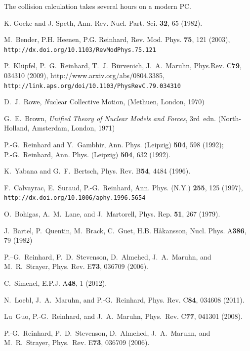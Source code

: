 \documentclass[A4]{elsarticle}
\begin{document}
The collision calculation takes several hours on a modern PC.

\begin{thebibliography}{99}

K. Goeke and J. Speth,
Ann. Rev. Nucl. Part. Sci. {\bf 32}, 65 (1982).


M.~Bender, P.H. Heenen, P.G. Reinhard, Rev. Mod. Phys. \textbf{75}, 121 (2003),
  \texttt{http://dx.doi.org/10.1103/RevModPhys.75.121}

P.~Kl\"upfel, P.~G.~Reinhard, T.~J.~B\"urvenich, J.~A.~Maruhn, Phys.Rev. 
  C\textbf{79}, 034310 (2009), http://www.arxiv.org/abs/0804.3385,
  \texttt{http://link.aps.org/doi/10.1103/PhysRevC.79.034310}


{D.~J.~Rowe}, {\emph Nuclear Collective Motion}, 
({Methuen}, {London}, {1970})


G.~E.~Brown, \emph{Unified Theory of Nuclear Models and Forces}, 3rd~edn.
  (North-Holland, Amsterdam, London, 1971)


P.-G.~Reinhard and Y.~Gambhir,
{Ann. Phys. (Leipzig) } {\bf 504}, 598 (1992);
\\
{P.-G.~Reinhard},
{Ann. Phys. (Leipzig) } {\bf 504}, 632 (1992).


K.~Yabana and G.~F.~Bertsch,
Phys. Rev. B{\bf 54}, 4484 (1996).

F.~Calvayrac, E.~Suraud, P.-G.~Reinhard, Ann. Phys. (N.Y.) \textbf{255}, 125
  (1997), \texttt{http://dx.doi.org/10.1006/aphy.1996.5654}


O.~Bohigas, A.~M.~Lane, and J.~Martorell, 
Phys. Rep. {\bf 51}, 267 (1979).

J.~Bartel, P.~Quentin, M.~Brack, C.~Guet, H.B. H{\aa}kansson, Nucl. Phys.
  A\textbf{386}, 79 (1982)

 
P.--G.~Reinhard, P.~D.~Stevenson, D.~Almehed, J.~A.~Maruhn, and M.~R.~Strayer,
{Phys. Rev. E}{\bf 73}, 036709 (2006).

C.~Simenel, E.P.J. A{\bf 48}, 1 (2012).

N.~Loebl, J.~A.~Maruhn, and P.-G.~Reinhard,  Phys. Rev. C\textbf{84}, 034608 (2011).

Lu~Guo, P.-G.~Reinhard, and J.~A.~Maruhn,
Phys.~Rev. C{\bf 77}, 041301 (2008).

P.-G.~Reinhard, P.~D.~Stevenson, D.~Almehed, J.~A.~Maruhn, and M.~R.~Strayer,
Phys.~Rev. E{\bf 73}, 036709 (2006).
\end{thebibliography}
\end{document}
